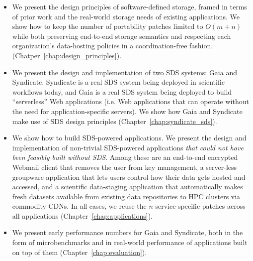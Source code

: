 \begin{itemize}

\item We present the design principles of software-defined storage, framed in
terms of prior work and the real-world storage needs of existing applications.
We show how to keep the number of portability patches limited to $O(m + n)$ while
both preserving end-to-end storage semantics and
respecting each organization's data-hosting policies in a coordination-free
fashion. (Chatper~\ref{chap:design_principles}).

\item We present the design and implementation of two SDS systems: Gaia and
Syndicate.  Syndicate is a real SDS system being deployed in scientific
workflows today, and Gaia is a real SDS system being deployed to build
``serverless'' Web applications (i.e. Web applications that can operate
without the need for application-specific servers).
We show how Gaia and Syndicate make use of SDS design principles
(Chapter~\ref{chap:syndicate_sds}).

\item We show how to build SDS-powered applications.  We present the design and
implementation of non-trivial SDS-powered applications \emph{that could not
have been feasibly built without SDS}.  Among these are an end-to-end encrypted
Webmail client that removes the user from key management, a server-less
groupware application that lets users control how their data gets hosted and
accessed, and a scientific data-staging application that
automatically makes fresh datasets available from existing data repositories to
HPC clusters via commodity CDNs.  In all cases, we reuse the $n$
service-specific patches across all applications
(Chapter~\ref{chap:applications}).

\item We present early performance numbers for Gaia and Syndicate, both in the
form of microbenchmarks and in real-world performance of applications built on
top of them (Chapter~\ref{chap:evaluation}).

\end{itemize}

